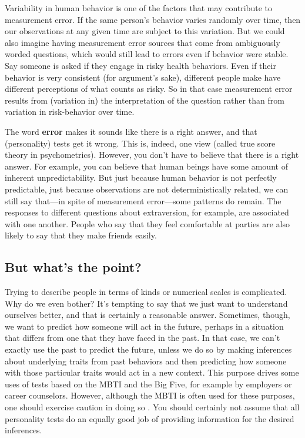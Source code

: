 \documentclass[openany]{book}
\begin{document}
Variability in human behavior is one of the factors that may contribute to measurement error. If the same person's behavior varies randomly over time, then our observations at any given time are subject to this variation. But we could also imagine having measurement error sources that come from ambiguously worded questions, which would still lead to errors even if behavior were stable. Say someone is asked if they engage in risky health behaviors. Even if their behavior is very consistent (for argument's sake), different people make have different perceptions of what counts as risky. So in that case measurement error results from (variation in) the interpretation of the question rather than from variation in risk-behavior over time.

The word \textbf{error} makes it sounds like there is a right answer, and that (personality) tests get it wrong. This is, indeed, one view (called true score theory in psychometrics). However, you don't have to believe that there is a right answer. For example, you can believe that human beings have some amount of inherent unpredictability. But just because human behavior is not perfectly predictable, just because observations are not deterministically related, we can still say that---in spite of measurement error---some patterns do remain. The responses to different questions about extraversion, for example, are associated with one another. People who say that they feel comfortable at parties are also likely to say that they make friends easily.

\hypertarget{but-whats-the-point}{%
\subsection*{But what's the point?}\label{but-whats-the-point}}

Trying to describe people in terms of kinds or numerical scales is complicated. Why do we even bother? It's tempting to say that we just want to understand ourselves better, and that is certainly a reasonable answer. Sometimes, though, we want to predict how someone will act in the future, perhaps in a situation that differs from one that they have faced in the past. In that case, we can't exactly use the past to predict the future, unless we do so by making inferences about underlying traits from past behaviors and then predicting how someone with those particular traits would act in a new context. This purpose drives some uses of tests based on the MBTI and the Big Five, for example by employers or career counselors. However, although the MBTI is often used for these purposes, one should exercise caution in doing so \citep{pittenger1993}. You should certainly not assume that all personality tests do an equally good job of providing information for the desired inferences.
\end{document}
